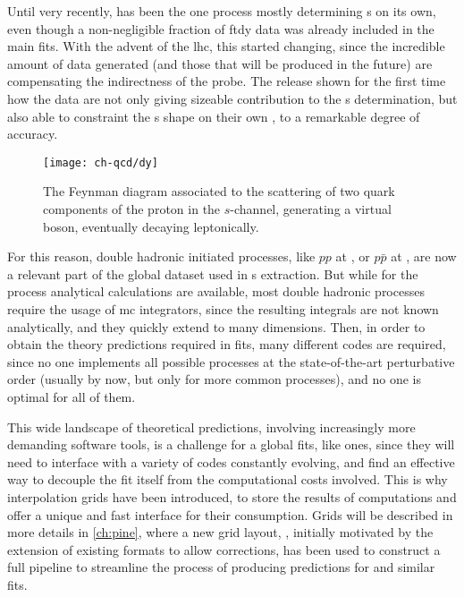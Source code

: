 
Until very recently, \dis has been the one process mostly determining \pdf{}s
on its own, even though a non-negligible fraction of \acrfull{ftdy} data was
already included in the main fits.
%
With the advent of the \acrfull{lhc}, this started changing, since the
incredible amount of data generated (and those that will be produced in the
future) are compensating the indirectness of the probe.
%
The  release shown for the first time how the \lhc data are not
only giving sizeable contribution to the \pdf{}s determination, but also able
to constraint the \pdf{}s shape on their own \cite{Ball:2021leu}, to a
remarkable degree of accuracy.

\begin{figure}
	\centering
	\texttt{[image: ch-qcd/dy]}
	\caption{
		The \lo Feynman diagram associated to the scattering of two quark
		components of the proton in the $s$-channel, generating a virtual \ew
		boson, eventually decaying leptonically.
	}
	\label{fig:qcd/dy}
\end{figure}

For this reason, double hadronic initiated processes, like $pp$ at \lhc, or
$p\bar{p}$ at \tevatron, are now a relevant part of the global \qcd dataset
used in \pdf{}s extraction.
%
But while for the \dis process analytical calculations are available, most
double hadronic processes require the usage of \acrfull{mc} integrators, since
the resulting integrals are not known analytically, and they quickly extend to
many dimensions.
%
Then, in order to obtain the theory predictions required in \pdf fits, many
different codes are required, since no one implements all possible processes at
the state-of-the-art perturbative order (usually \nnlo by now, but only for
more common processes), and no one is optimal for all of them.

This wide landscape of theoretical predictions, involving increasingly more
demanding software tools, is a challenge for a global \qcd fits, like \pdf
ones, since they will need to interface with a variety of codes constantly
evolving, and find an effective way to decouple the fit itself from the
computational costs involved.
%
This is why interpolation grids have been introduced, to store the results of
\mc computations and offer a unique and fast interface for their consumption.
Grids will be described in more details in \cref{ch:pine}, where a new grid
layout, \pineappl \cite{Carrazza:2020gss}, initially motivated by the extension
of existing formats to allow \ew corrections, has been used to construct a full
pipeline to streamline the process of producing predictions for \pdf and
similar fits.

